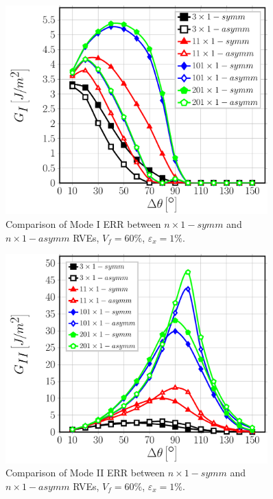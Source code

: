 \begin{figure}[!htb]
\centering
  \includegraphics[width=0.9\textwidth]{paperD/nx1-coupling-vf60-GI.pdf}
\caption{Comparison of Mode I ERR between $n \times 1-symm$ and $n \times 1-asymm$ RVEs, $V_{f}=60\%$, $\varepsilon_{x}=1\%$.}\label{chap3:paperD:fig:nx1-GI}
\end{figure}

\begin{figure}[!htb]
\centering
  \includegraphics[width=0.9\textwidth]{paperD/nx1-coupling-vf60-GII.pdf}
\caption{Comparison of Mode II ERR between $n \times 1-symm$ and $n \times 1-asymm$ RVEs, $V_{f}=60\%$, $\varepsilon_{x}=1\%$.}\label{chap3:paperD:fig:nx1-GII}
\end{figure}

